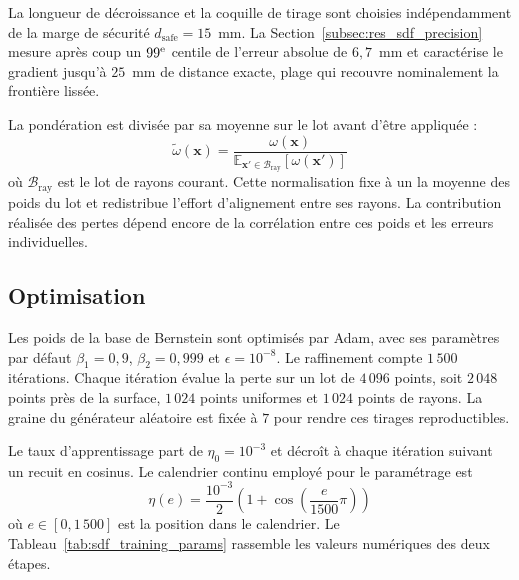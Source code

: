 La longueur de décroissance et la coquille de tirage sont choisies indépendamment de la marge de sécurité $d_{\mathrm{safe}}=15$~mm. La Section~\ref{subsec:res_sdf_precision} mesure après coup un $99\textsuperscript{e}$ centile de l'erreur absolue de $6{,}7$~mm et caractérise le gradient jusqu'à $25$~mm de distance exacte, plage qui recouvre nominalement la frontière lissée.

La pondération est divisée par sa moyenne sur le lot avant d'être appliquée :
\begin{equation}\label{eq:omega_normalized}
  \tilde{\omega}(\mathbf{x}) = \frac{\omega(\mathbf{x})}{\mathbb{E}_{\mathbf{x}' \in \mathcal{B}_{\mathrm{ray}}}[\omega(\mathbf{x}')]}
\end{equation}
où $\mathcal{B}_{\mathrm{ray}}$ est le lot de rayons courant. Cette normalisation fixe à un la moyenne des poids du lot et redistribue l'effort d'alignement entre ses rayons. La contribution réalisée des pertes dépend encore de la corrélation entre ces poids et les erreurs individuelles.

\subsection*{Optimisation}

Les poids de la base de Bernstein sont optimisés par Adam, avec ses paramètres par défaut $\beta_1 = 0{,}9$, $\beta_2 = 0{,}999$ et $\epsilon = 10^{-8}$. Le raffinement compte $1\,500$ itérations. Chaque itération évalue la perte sur un lot de $4\,096$ points, soit $2\,048$ points près de la surface, $1\,024$ points uniformes et $1\,024$ points de rayons. La graine du générateur aléatoire est fixée à $7$ pour rendre ces tirages reproductibles.

Le taux d'apprentissage part de $\eta_0 = 10^{-3}$ et décroît à chaque itération suivant un recuit en cosinus. Le calendrier continu employé pour le paramétrage est
\begin{equation}\label{eq:cosine_annealing}
  \eta(e) = \frac{10^{-3}}{2}\left(1 + \cos\left(\frac{e}{1500}\pi\right)\right)
\end{equation}
où $e\in[0,1\,500]$ est la position dans le calendrier. Le Tableau~\ref{tab:sdf_training_params} rassemble les valeurs numériques des deux étapes.


